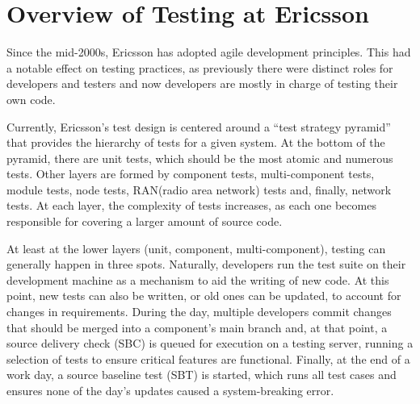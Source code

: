\section{Overview of Testing at Ericsson}\label{sec:ind_overview}

%

%
%

Since the mid-2000s, Ericsson has adopted agile development principles.
This had a notable effect on testing practices, as previously there were distinct roles for developers and testers and now developers are mostly in charge of testing their own code.

Currently, Ericsson's test design is centered around a ``test strategy pyramid'' that provides the hierarchy of tests for a given system.
At the bottom of the pyramid, there are unit tests, which should be the most atomic and numerous tests.
Other layers are formed by component tests, multi-component tests, module tests, node tests, RAN(radio area network) tests and, finally, network tests.
At each layer, the complexity of tests increases, as each one becomes responsible for covering a larger amount of source code.

At least at the lower layers (unit, component, multi-component), testing can generally happen in three spots.
Naturally, developers run the test suite on their development machine as a mechanism to aid the writing of new code.
At this point, new tests can also be written, or old ones can be updated, to account for changes in requirements.
During the day, multiple developers commit changes that should be merged into a component's main branch and, at that point, a source delivery check (SBC) is queued for execution on a testing server, running a selection of tests to ensure critical features are functional.
Finally, at the end of a work day, a source baseline test (SBT) is started, which runs all test cases and ensures none of the day's updates caused a system-breaking error.

